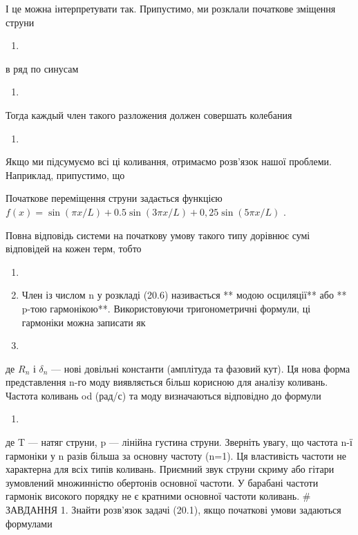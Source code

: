 \documentclass[
  ukrainian,
]{article}
\providecommand{\tightlist}{%
  \setlength{\itemsep}{0pt}\setlength{\parskip}{0pt}}
\begin{document}
І це можна інтерпретувати так. Припустимо, ми розклали початкове
зміщення струни

\begin{enumerate}
\def\labelenumi{\arabic{enumi}.}
\setcounter{enumi}{14}
\tightlist
\item
\end{enumerate}

в ряд по синусам

\begin{enumerate}
\def\labelenumi{\arabic{enumi}.}
\setcounter{enumi}{15}
\tightlist
\item
\end{enumerate}

Тогда каждый член такого разложения должен совершать колебания

\begin{enumerate}
\def\labelenumi{\arabic{enumi}.}
\setcounter{enumi}{16}
\tightlist
\item
\end{enumerate}

Якщо ми підсумуємо всі ці коливання, отримаємо розв'язок нашої проблеми.
Наприклад, припустимо, що

Початкове переміщення струни задається функцією
\(f(x) = \sin(\pi x/L) + 0.5 \sin(3\pi x/ L) + 0,25 \sin(5\pi x/L)\) .

Повна відповідь системи на початкову умову такого типу дорівнює сумі
відповідей на кожен терм, тобто

\begin{enumerate}
\def\labelenumi{\arabic{enumi}.}
\setcounter{enumi}{17}
\item
\item
  Член із числом n у розкладі (20.6) називається ** модою осциляції**
  або ** p-тою гармонікою**. Використовуючи тригонометричні формули, ці
  гармоніки можна записати як
\item
\end{enumerate}

де \(R_n\) і \(\delta_n\) --- нові довільні константи (амплітуда та
фазовий кут). Ця нова форма представлення n-го моду виявляється більш
корисною для аналізу коливань. Частота коливань od (рад/с) та моду
визначаються відповідно до формули

\begin{enumerate}
\def\labelenumi{\arabic{enumi}.}
\setcounter{enumi}{9}
\tightlist
\item
\end{enumerate}

де T --- натяг струни, p --- лінійна густина струни. Зверніть увагу, що
частота n-ї гармоніки у n разів більша за основну частоту (n=1). Ця
властивість частоти не характерна для всіх типів коливань. Приємний звук
струни скриму або гітари зумовлений множинністю обертонів основної
частоти. У барабані частоти гармонік високого порядку не є кратними
основної частоти коливань. \# ЗАВДАННЯ 1. Знайти розв'язок задачі
(20.1), якщо початкові умови задаються формулами
\end{document}
